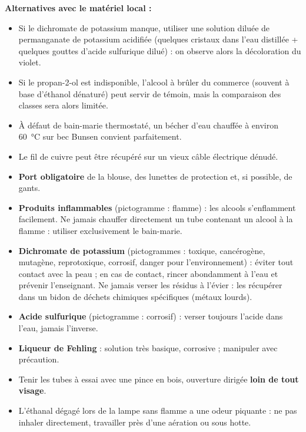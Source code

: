 \documentclass[11pt]{article}
\newcommand{\cle}[1]{{\popxbold\color{popdark}#1}}
\newcounter{popsec}
\newcounter{popsub}
\newcommand{\courssub}[1]{%
  \stepcounter{popsub}%
  \par\vspace{9pt}\noindent{\popxbold\fontsize{11.5}{13}\selectfont\color{popink}{\color{poporange}\thepopsec.\thepopsub}\hspace{6pt}#1}\par\nopagebreak\vspace{4pt}
}
\begin{document}
\textbf{Alternatives avec le matériel local :}
\begin{itemize}
\item Si le \cle{dichromate de potassium} manque, utiliser une solution diluée de \cle{permanganate de potassium}  acidifiée (quelques cristaux dans l'eau distillée + quelques gouttes d'acide sulfurique dilué) : on observe alors la décoloration du violet.
\item Si le propan-2-ol est indisponible, l'alcool à brûler du commerce (souvent à base d'éthanol dénaturé) peut servir de témoin, mais la comparaison des classes sera alors limitée.
\item À défaut de bain-marie thermostaté, un bécher d'eau chauffée à environ \SI{60}{\celsius} sur bec Bunsen convient parfaitement.
\item Le fil de cuivre peut être récupéré sur un vieux câble électrique dénudé.
\end{itemize}

\courssub{Sécurité}

\begin{attention}
\begin{itemize}
\item \textbf{Port obligatoire} de la blouse, des lunettes de protection et, si possible, de gants.
\item \textbf{Produits inflammables} (pictogramme : flamme) : les alcools s'enflamment facilement. Ne jamais chauffer directement un tube contenant un alcool à la flamme : utiliser exclusivement le \cle{bain-marie}.
\item \textbf{Dichromate de potassium} (pictogrammes : toxique, cancérogène, mutagène, reprotoxique, corrosif, danger pour l'environnement) : éviter tout contact avec la peau ; en cas de contact, rincer abondamment à l'eau et prévenir l'enseignant. Ne jamais verser les résidus à l'évier : les récupérer dans un bidon de déchets chimiques spécifiques (métaux lourds).
\item \textbf{Acide sulfurique} (pictogramme : corrosif) : verser toujours l'acide dans l'eau, jamais l'inverse.
\item \textbf{Liqueur de Fehling} : solution très basique, corrosive ; manipuler avec précaution.
\item Tenir les tubes à essai avec une pince en bois, ouverture dirigée \textbf{loin de tout visage}.
\item L'éthanal dégagé lors de la lampe sans flamme a une odeur piquante : ne pas inhaler directement, travailler près d'une aération ou sous hotte.
\end{itemize}
\end{attention}
\end{document}
